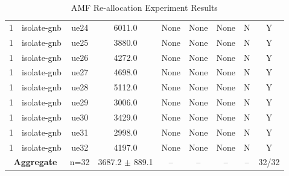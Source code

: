 \begin{table}[ht]
\begin{tabular}{|c|c|c|c|c|c|c|c|c|}
1 & isolate-gnb & ue24 & 6011.0 & None & None & None & N & Y \\
1 & isolate-gnb & ue25 & 3880.0 & None & None & None & N & Y \\
1 & isolate-gnb & ue26 & 4272.0 & None & None & None & N & Y \\
1 & isolate-gnb & ue27 & 4698.0 & None & None & None & N & Y \\
1 & isolate-gnb & ue28 & 5112.0 & None & None & None & N & Y \\
1 & isolate-gnb & ue29 & 3006.0 & None & None & None & N & Y \\
1 & isolate-gnb & ue30 & 3429.0 & None & None & None & N & Y \\
1 & isolate-gnb & ue31 & 2998.0 & None & None & None & N & Y \\
1 & isolate-gnb & ue32 & 4197.0 & None & None & None & N & Y \\
\multicolumn{2}{|c|}{\textbf{Aggregate}} & n=32 & 3687.2 $\pm$ 889.1 & -- & -- & -- & -- & 32/32 \\
\hline
\end{tabular}
\caption{AMF Re-allocation Experiment Results}
\label{tab:amf_realloc}
\end{table}
